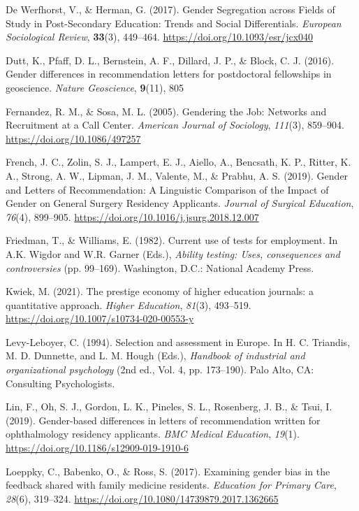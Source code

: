 \documentclass[12pt]{caltech_thesis}
\begin{document}
    De Werfhorst, V., \& Herman, G. (2017). Gender Segregation across Fields of Study in Post-Secondary Education: Trends and Social Differentials. \textit{European Sociological Review}, \textbf{33}(3), 449--464. \url{https://doi.org/10.1093/esr/jcx040}
   
    Dutt, K., Pfaff, D. L., Bernstein, A. F., Dillard, J. P., \& Block, C. J. (2016). Gender differences in recommendation letters for postdoctoral fellowships in geoscience. \textit{Nature Geoscience}, \textbf{9}(11), 805
   
    Fernandez, R. M., \& Sosa, M. L. (2005). Gendering the Job: Networks and Recruitment at a Call Center. \textit{American Journal of Sociology}, \textit{111}(3), 859--904. \url{https://doi.org/10.1086/497257}
   
    French, J. C., Zolin, S. J., Lampert, E. J., Aiello, A., Bencsath, K. P., Ritter, K. A., Strong, A. W., Lipman, J. M., Valente, M., \& Prabhu, A. S. (2019). Gender and Letters of Recommendation: A Linguistic Comparison of the Impact of Gender on General Surgery Residency Applicants. \textit{Journal of Surgical Education}, \textit{76}(4), 899--905. \url{https://doi.org/10.1016/j.jsurg.2018.12.007}
   
    Friedman, T., \& Williams, E. (1982). Current use of tests for employment. In A.K. Wigdor and W.R. Garner (Eds.), \textit{Ability testing: Uses, consequences and controversies} (pp. 99--169). Washington, D.C.: National Academy Press.
   
    Kwiek, M. (2021). The prestige economy of higher education journals: a quantitative approach. \textit{Higher Education}, \textit{81}(3), 493--519. \url{https://doi.org/10.1007/s10734-020-00553-y}
   
    Levy-Leboyer, C. (1994). Selection and assessment in Europe. In H. C. Triandis, M. D. Dunnette, and L. M. Hough (Eds.), \textit{Handbook of industrial and organizational psychology} (2nd ed., Vol. 4, pp. 173--190). Palo Alto, CA: Consulting Psychologists.
   
    Lin, F., Oh, S. J., Gordon, L. K., Pineles, S. L., Rosenberg, J. B., \& Tsui, I. (2019). Gender-based differences in letters of recommendation written for ophthalmology residency applicants. \textit{BMC Medical Education}, \textit{19}(1). \url{https://doi.org/10.1186/s12909-019-1910-6}
   
    Loeppky, C., Babenko, O., \& Ross, S. (2017). Examining gender bias in the feedback shared with family medicine residents. \textit{Education for Primary Care}, \textit{28}(6), 319--324. \url{https://doi.org/10.1080/14739879.2017.1362665}
   
\end{document}
